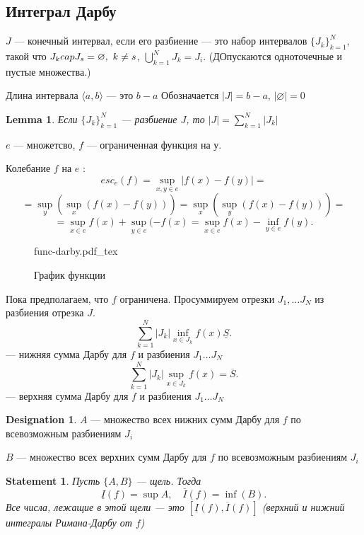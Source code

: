 \documentclass[11pt]{book}
\newcommand{\incfig}[1]{%
    \def\svgwidth{\columnwidth}
    {#1.pdf_tex}
}
\newcommand{\slim}{\sum\limits}
\theoremstyle{definition}
\theoremstyle{plain}
\theoremstyle{plain}
\newtheorem*{lm}{Lemma}
\newtheorem*{st}{Statement}
\theoremstyle{definition}
\newtheorem*{name}{Designation}
\theoremstyle{remark}
\begin{document}
\subsection{Интеграл Дарбу}
\begin{defn}
    $ J$ --- конечный интервал, если его разбиение --- это набор  интервалов $ \{J_k\}^{N}_{k=1}$, такой что $ J_k \\cap  J_s = \varnothing, ~k \ne s $,
    $ \bigcup_{k=1}^{{N}} J_k = J_i $. (ДОпускаются одноточечные и пустые множества.)

\end{defn}
\begin{defn}
    Длина интервала $ \langle a, b \rangle$ --- это $ b - a$
    Обозначается $ |J| = b-a$, $ |\varnothing| = 0$
\end{defn}
\begin{lm}
    Если $ \{J_k\}_{k= 1}^{N}$ --- разбиение $ J$, то $|J| = \slim_{k=1}^{N}  |J_k|$
\end{lm}
\begin{defn}
    $ e$ --- множетсво, $ f$ --- ограниченная функция на $ у$.

    Колебание $ f$ на $  e$ :
    \[
	esc_e (f) = \sup_{x, y \in  e} |f(x) - f(y)|=
    \]
    \[
	=	\sup_{y} \left( \sup_x (f(x) - f(y)) \right)  = \sup_x \left( \sup_y (f(x) - f(y))  \right) =
    \]
    \[
	=\sup_{x \in  e}  f(x)  + \sup_{y \in  e}(-f(x) = \sup _{x \in  e} f(x) - \inf_{y \in  e} f(y)
    .\]
\end{defn}
\begin{figure}[ht]
    \centering
    \incfig{func-darby}
    \caption{График функции}
    \label{fig:func-darby}
\end{figure}
Пока предполагаем, что $ f$ ограничена.
Просуммируем отрезки $ J_1, \ldots J_N $ из разбиения отрезка $ J$.
\[
    \slim_{k= 1}^{N} |J_k|\inf_{x \in  J_k} f(x) \underline{S}
.\] --- нижняя сумма Дарбу  для $ f$ и разбиения $ J_1 \ldots  J_N$
\[
    \slim_{k= 1}^{N} |J_k|\sup_{x \in  J_k} f(x) =\overline{S}
.\] --- верхняя сумма Дарбу  для $ f$ и разбиения $ J_1 \ldots  J_N$
\begin{name}
    $ A$ --- множество всех нижних сумм Дарбу для $ f$ по всевозможным разбиениям $ J_i$

    $ B$ --- множество всех верхних сумм Дарбу для $ f$ по всевозможным разбиениям $ J_i$
\end{name}
\begin{st}
    Пусть $ \{A, B\}$ --- щель. Тогда
    \[
	\underline{I}(f) = \sup{ A} , \quad \overline{I}(f) = \inf(B)
    .\]
    Все числа, лежащие в этой щели --- это $ [ \underline{I} (f) , \overline{I}(f)]$ (верхний и нижний интегралы Римана-Дарбу от $ f$)
\end{st}
\end{document}
